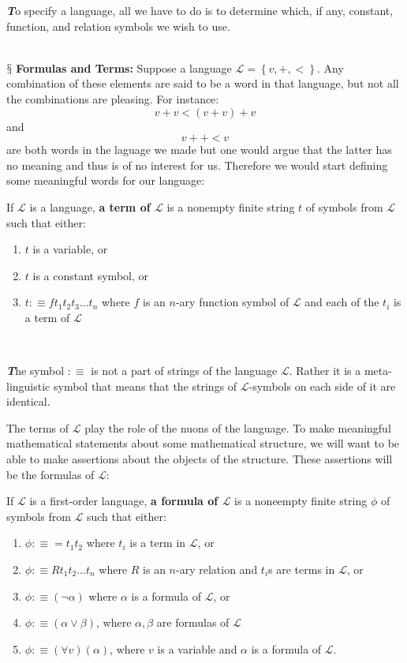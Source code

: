 \documentclass[9pt,a4paper, twocolumn]{article}
\newenvironment{callout}
	{\begin{calloutbox}\color{charcoal}\textbf\textit}
	{\end{calloutbox}}
\newcommand{\newpoint}[1]{\ \\ \indent$\mathsection$ \textbf{#1}}
\newcommand{\curveL}{\mathcal{L}}
\begin{document}
        \begin{callout}
            To specify a language, all we have to do is to determine which, if any, constant, function, and relation symbols we wish to use.
        \end{callout}
        \newpoint{Formulas and Terms:} Suppose a language $\curveL = \left\{v, + , <\right\}$. Any combination of these elements are said to be a word in that language, but not all the combinations are pleasing. For instance:
        $$
        v + v < (v + v) + v
        $$
        and 
        $$
        v ++<v
        $$
        are both words in the laguage we made but one would argue that the latter has no meaning and thus is of no interest for us. Therefore we would start defining some meaningful words for our language:
        \begin{define}
            If $\curveL$ is a language, \textbf{a term of $\curveL$} is a nonempty finite string $t$ of symbols from $\curveL$ such that either:
            \begin{enumerate}
                \item $t$ is a variable, or
                \item $t$ is a constant symbol, or
                \item $t:\equiv ft_1t_2t_3\dots t_n$ where $f$ is an $n$-ary function symbol of $\curveL$ and each of the $t_i$ is a term of $\curveL$
            \end{enumerate}
            \
        \end{define}
        \begin{callout}
            The symbol $:\equiv$ is not a part of strings of the language $\curveL$. Rather it is a meta-linguistic symbol that means that the strings of $\curveL$-symbols on each side of it are identical.
        \end{callout}
        The terms of $\curveL$ play the role of the nuons of the language. To make meaningful mathematical statements about some mathematical structure, we will want to be able to make assertions about the objects of the structure. These assertions will be the formulas of $\curveL$:
        \begin{define}
            If $\curveL$ is a first-order language, \textbf{a formula of $\curveL$} is a noneempty finite string $\phi$ of symbols from $\curveL$ such that either:
            \begin{enumerate}
                \item $\phi:\equiv = t_1t_2$ where $t_i$ is a term in $\curveL$, or
                \item $\phi:\equiv Rt_1t_2\dots t_n$ where $R$ is an $n$-ary relation and $t_i$s are terms in $\curveL$, or
                \item $\phi :\equiv (\neg\alpha)$ where $\alpha$ is a formula of $\curveL$, or
                \item $\phi:\equiv (\alpha\lor\beta)$, where $\alpha, \beta$ are formulas of $\curveL$
                \item $\phi:\equiv (\forall v)(\alpha)$, where $v$ is a variable and $\alpha$ is a formula of $\curveL$.
            \end{enumerate}
        \end{define}
\end{document}
